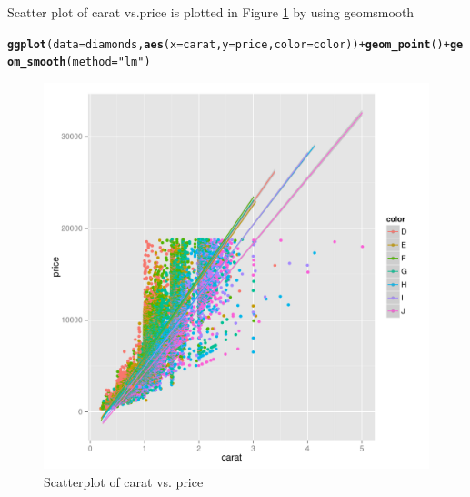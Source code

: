 \documentclass{article}\usepackage[]{graphicx}\usepackage[]{color}
\makeatletter
\newcommand{\hlstr}[1]{\textcolor[rgb]{0.192,0.494,0.8}{#1}}%
\newcommand{\hlopt}[1]{\textcolor[rgb]{0,0,0}{#1}}%
\newcommand{\hlstd}[1]{\textcolor[rgb]{0.345,0.345,0.345}{#1}}%
\newcommand{\hlkwc}[1]{\textcolor[rgb]{0.333,0.667,0.333}{#1}}%
\newcommand{\hlkwd}[1]{\textcolor[rgb]{0.737,0.353,0.396}{\textbf{#1}}}%
\newenvironment{kframe}{%
 \def\at@end@of@kframe{}%
 \ifinner\ifhmode%
  \def\at@end@of@kframe{\end{minipage}}%
  \begin{minipage}{\columnwidth}%
 \fi\fi%
 \def\FrameCommand##1{\hskip\@totalleftmargin \hskip-\fboxsep
 \colorbox{shadecolor}{##1}\hskip-\fboxsep
     \hskip-\linewidth \hskip-\@totalleftmargin \hskip\columnwidth}%
 \MakeFramed {\advance\hsize-\width
   \@totalleftmargin\z@ \linewidth\hsize
   \@setminipage}}%
 {\par\unskip\endMakeFramed%
 \at@end@of@kframe}
\newenvironment{knitrout}{}{} %
\makeatother
\begin{document}
Scatter plot of carat vs.price is plotted in Figure \ref{fig:diamonds-plot} by using geomsmooth
\begin{knitrout}
\color{fgcolor}\begin{kframe}
\begin{alltt}
\hlkwd{ggplot}\hlstd{(}\hlkwc{data}\hlstd{=diamonds,} \hlkwd{aes}\hlstd{(}\hlkwc{x}\hlstd{=carat,} \hlkwc{y}\hlstd{=price,} \hlkwc{color}\hlstd{=color))}\hlopt{+} \hlkwd{geom_point}\hlstd{()} \hlopt{+} \hlkwd{geom_smooth}\hlstd{(}\hlkwc{method}\hlstd{=}\hlstr{"lm"}\hlstd{)}
\end{alltt}
\end{kframe}\begin{figure}[]

\includegraphics[width=.95\linewidth]{figure/diamonds-plot} \caption[Scatterplot of carat vs]{Scatterplot of carat vs. price\label{fig:diamonds-plot}}
\end{figure}


\end{knitrout}
\end{document}
